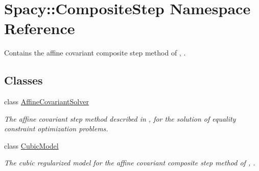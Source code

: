 \hypertarget{namespaceSpacy_1_1CompositeStep}{}\section{Spacy\+:\+:Composite\+Step Namespace Reference}
\label{namespaceSpacy_1_1CompositeStep}


Contains the affine covariant composite step method of \cite{Lubkoll2015}, \cite{Lubkoll2015a}.  


\subsection*{Classes}
\begin{DoxyCompactItemize}
\item 
class \hyperlink{classSpacy_1_1CompositeStep_1_1AffineCovariantSolver}{Affine\+Covariant\+Solver}
\begin{DoxyCompactList}\small\item\em The affine covariant step method described in \cite{Lubkoll2015}, \cite{Lubkoll2015a} for the solution of equality constraint optimization problems. \end{DoxyCompactList}\item 
class \hyperlink{classSpacy_1_1CompositeStep_1_1CubicModel}{Cubic\+Model}
\begin{DoxyCompactList}\small\item\em The cubic regularized model for the affine covariant composite step method of \cite{Lubkoll2015}, \cite{Lubkoll2015a}. \end{DoxyCompactList}\end{DoxyCompactItemize}
